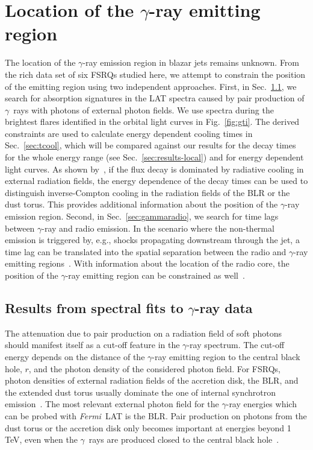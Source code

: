 \documentclass[twocolumn]{aastex62}
\newcommand{\Grays}{$\gamma$~rays\xspace}
\newcommand{\gray}{$\gamma$-ray\xspace}
\newcommand{\FermiLAT}{\emph{Fermi}~LAT\xspace}
\begin{document}
\section{Location of the $\gamma$-ray emitting region}
The location of the \gray emission region in blazar jets remains unknown. 
From the rich data set of six FSRQs studied here, we attempt to constrain the position of the emitting region using two independent approaches. 
First, in Sec.~\ref{sec:blrabs}, we search for absorption signatures in the LAT spectra caused by pair production of \Grays with photons of external photon fields. We use spectra during the brightest flares identified in the orbital light curves in Fig.~\ref{fig:gti}.
The derived constraints are used to calculate energy dependent cooling times in Sec.~\ref{sec:tcool}, which will be compared against our results for the decay times for the whole energy range (see Sec.~\ref{sec:results-local}) and for energy dependent light curves.
As shown by~\citet{2012ApJ...758L..15D}, if the flux decay is dominated by radiative cooling in external radiation fields, the energy dependence of the decay times can be used to distinguish inverse-Compton cooling in the radiation fields of the BLR or the dust torus.
This provides additional information about the position of the \gray emission region.
Second, in Sec.~\ref{sec:gammaradio}, we search for time lags between \gray and radio emission. 
In the scenario where the non-thermal emission is triggered by, e.g., shocks propagating downstream through the jet, a time lag can be translated into the spatial separation between the radio and \gray emitting regions~\citep{2014MNRAS.445..428M}. 
With information about the location of the radio core, the position of the \gray emitting region can be constrained as well~\citep[e.g.,][]{2014MNRAS.441.1899F}. 

\subsection{Results from spectral fits to \gray data}
\label{sec:blrabs}
The attenuation due to pair production on a radiation field of soft photons should manifest itself as a cut-off feature in the \gray spectrum. 
The cut-off energy depends on the distance of the \gray emitting region to the central black hole, $r$, and the photon density of the considered photon field.
For FSRQs, photon densities of external radiation fields of the accretion disk, the BLR, and the extended dust torus usually dominate the one of internal synchrotron emission~\citep[see,e.g.,][]{2012ApJ...758L..15D}.
The most relevant external photon field for the \gray energies which can be probed with \FermiLAT is the BLR. 
Pair production on photons from the dust torus or the accretion disk only becomes important at energies beyond 1\,TeV, even when the \Grays are produced closed to the central black hole~\citep{finke2016}.
\end{document}
